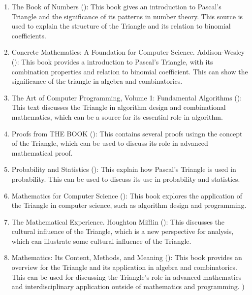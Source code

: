 \documentclass{article}
\begin{document}
\begin{enumerate}
    \item The Book of Numbers (\cite{conway1996}): This book gives an introduction to Pascal's Triangle and the significance of its patterns in number theory. This source is used to explain the structure of the Triangle and its relation to binomial coefficients.

    \item Concrete Mathematics: A Foundation for Computer Science. Addison-Wesley (\cite{graham1994}): This book provides a introduction to Pascal's Triangle, with its combination properties and relation to binomial coefficient. This can show the significance of the triangle in algebra and combinatorics.

    \item The Art of Computer Programming, Volume 1: Fundamental Algorithms (\cite{knuth1997}): This text discusses the Triangle in algorithm design and combinational mathematics, which can be a source for its essential role in algorithm.

    \item Proofs from THE BOOK (\cite{aigner2018}): This contains several proofs usingn the concept of the Triangle, which can be used to discuss its role in advanced mathematical proof.

    \item Probability and Statistics (\cite{degroot2011}): This explain how Pascal's Triangle is used in probability. This can be used to discuss its use in probability and statistics.

    \item Mathematics for Computer Science (\cite{lehman2017}): This book explores the application of the Triangle in computer science, such as algorithm design and programming.

    \item The Mathematical Experience. Houghton Mifflin (\cite{davis1999}): This discusses the cultural influence of the Triangle, which is a new perspective for analysis, which can illustrate some cultural influence of the Triangle.

    \item Mathematics: Its Content, Methods, and Meaning (\cite{aleksandrov1999}): This book provides an overview for the Triangle and its application in algebra and combinatorics. This can be used for discussing the Triangle's role in advanced mathematics and interdisciplinary application outside of mathematics and programming.
)\end{enumerate}



\newpage

\printbibliography
\end{document}
